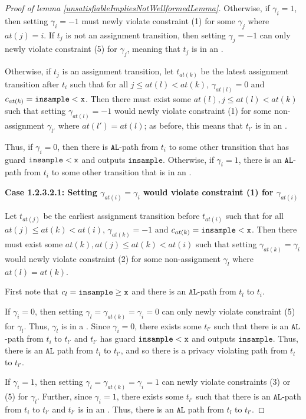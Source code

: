 \begin{proof}[Proof of lemma \ref{unsatisfiableImpliesNotWellformedLemma}]
    Otherwise, if $\gamma_i = 1$, then setting $\gamma_i = -1$ must newly violate constraint (1) for some $\gamma_j$ where $at(j) = i$. If $t_{j}$ is not an assignment transition, then setting $\gamma_{j} = -1$ can only newly violate constraint (5) for $\gamma_{j}$, meaning that $t_j$ is in an \lcycle. 

    Otherwise, if $t_j$ is an assignment transition, let $t_{at(k)}$ be the latest assignment transition after $t_{i}$ such that for all $j\leq at(l)< at(k)$, $\gamma_{at(l)} =0$ and $c_{at(k)} = \lguard[\texttt{x}]$. Then there must exist some $at(l), j\leq at(l)< at(k)$ such that setting $\gamma_{at(l)}=-1$ would newly violate constraint (1) for some non-assignment $\gamma_{l'}$ where $at(l') = at(l)$; as before, this means that $t_{l'}$ is in an \lcycle.  

    Thus, if $\gamma_i =0$, then there is $\texttt{AL}$-path from $t_i$ to some other transition that has guard $\lguard[\texttt{x}]$ and outputs $\texttt{insample}$. Otherwise, if $\gamma_i = 1$, there is an $\texttt{AL}$-path from $t_i$ to some other transition that is in an \lcycle. 

    \textbf{Case 1.2.3.2.1: Setting $\gamma_{at(i)} = \gamma_i$ would violate constraint (1) for $\gamma_{at(i)}$}

    Let $t_{at(j)}$ be the earliest assignment transition before $t_{at(i)}$ such that for all $at(j)\leq at(k)< at(i)$, $\gamma_{at(k)} =-1$ and $c_{at(k)} = \lguard[\texttt{x}]$. Then there must exist some $at(k), at(j)\leq at(k)< at(i)$ such that setting $\gamma_{at(k)}=\gamma_i$ would newly violate constraint (2) for some non-assignment $\gamma_l$ where $at(l) = at(k)$.

    First note that $c_l = \gguard[\texttt{x}]$ and there is an $\texttt{AL}$-path from $t_l$ to $t_i$. 
    
    If $\gamma_i = 0$, then setting $\gamma_l = \gamma_{at(k)} = \gamma_i = 0$ can only newly violate constraint (5) for $\gamma_l$. Thus, $\gamma_l$ is in a \gcycle. Since $\gamma_i = 0$, there exists some $t_{l'}$ such that there is an $\texttt{AL}$-path from $t_i$ to $t_{l'}$ and $t_{l'}$ has guard $\lguard[\texttt{x}]$ and outputs $\texttt{insample}$. Thus, there is an $\texttt{AL}$ path from $t_l$ to $t_{l'}$, and so there is a privacy violating path from $t_l$ to $t_{l'}$. 
    
    If $\gamma_i = 1$, then setting $\gamma_l = \gamma_{at(k)} = \gamma_i = 1$ can newly violate constraints (3) or (5) for $\gamma_l$. Further, since $\gamma_i =1$, there exists some $t_{l'}$ such that there is an $\texttt{AL}$-path from $t_i$ to $t_{l'}$ and $t_{l'}$ is in an \lcycle. Thus, there is an $\texttt{AL}$ path from $t_l$ to $t_{l'}$.
    

\end{proof}
